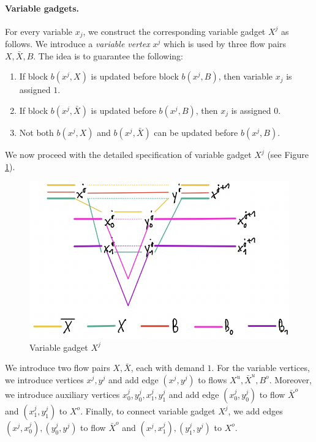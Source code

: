 \documentclass[fontsize=11pt,paper=a4]{book}
\begin{document}
\paragraph{Variable gadgets.}
For every variable \(x_j\), we construct the corresponding variable gadget \(X^j\) as follows.
We introduce a \emph{variable vertex} \(x^j\) which is used by three flow pairs \(X,\bar{X},B\). The idea is to guarantee the following:

\begin{enumerate}
\item If block \(b(x^j,X)\) is updated before block \(b(x^j,B)\), then variable \(x_j\) is assigned \(1\).
\item If block \(b(x^j,\bar{X})\) is updated before \(b(x^j,B)\), then \(x_j\) is assigned \(0\).
\item Not both \(b(x^j,X)\) and \(b(x^j,\bar{X})\) can be updated before \(b(x^j,B)\).
\end{enumerate}

We now proceed with the detailed specification of variable gadget \(X^j\) (see Figure \ref{fig:org59b2466}).

\begin{figure}[htbp]
\centering
\includegraphics[width=.9\linewidth]{../assets/Screen Shot 2023-02-14 at 15.06.35.png}
\caption{\label{fig:org59b2466}Variable gadget \(X^j\)}
\end{figure}

We introduce two flow pairs \(X,\bar{X}\), each with demand \(1\).
For the variable vertices, we introduce vertices \(x^j,y^j\) and add edge \((x^j,y^j)\) to flows \(X^u,\bar{X}^u,B^o\).
Moreover, we introduce auxiliary vertices \(x_0^j,y_0^j,x_1^j,y_1^j\) and add edge \((x_0^j,y_0^j)\) to flow \(\bar{X}^o\) and \((x_1^j,y_1^j)\) to \(X^o\).
Finally, to connect variable gadget \(X^j\), we add edges \((x^j,x_0^j),(y_0^j,y^j)\) to flow \(\bar{X}^o\) and \((x^j,x_1^j),(y_1^j,y^j)\) to \(X^o\).
\end{document}
